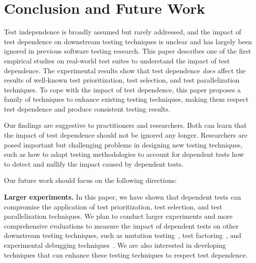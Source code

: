 \section{Conclusion and Future Work}

Test independence is broadly assumed but rarely addressed, and
the impact of test dependence on downstream
testing techniques is unclear and has largely been ignored in
previous software testing research. This paper describes
one of the first empirical studies on real-world test suites to
understand the impact of test dependence. The experimental
results show that test dependence \textit{does} affect the results
of well-known test prioritization, test selection, and test
parallelization techniques. To cope with the impact of test
dependence, this paper proposes a family of techniques
to enhance existing testing techniques, making them respect test dependence
and produce consistent testing results.


Our findings are suggestive to practitioners and researchers.
Both can learn that the impact of test dependence 
should not be ignored any longer. Researchers are posed important
but challenging problems in designing new testing techniques,
such as how to adapt testing methodologies to account for
dependent tests how to detect and nullify the impact
caused by dependent tests.

Our future work should focus on the following directions:

\vspace{1mm}

\noindent \textbf{{Larger experiments.}}
In this paper, we have shown that dependent tests
can compromise the application of
\prionum test prioritization, \selnum test selection,
and \parnum test parallelization techniques.
We plan to conduct larger experiments and more
comprehensive evaluations to
measure the impact of dependent tests on other
downstream testing techniques, such as mutation testing~\cite{Zhang:2012:RMT, Schuler:2009:EMT, Zhang:2013:FMT},
test factoring~\cite{Saff:2005, Wu:2010:LRV}, and experimental
debugging techniques~\cite{Zeller:2002, Steimann:2013, Zhang:2013:IMF}.
We are also interested in developing techniques that can enhance these
testing techniques to respect test dependence.



\vspace{1mm}

